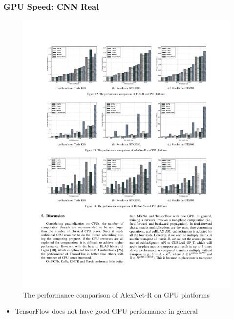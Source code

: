 \begin{frame}
	\MyLogo
	\frametitle{GPU Speed: CNN Real}

	\begin{figure}[htbp] 
		\includegraphics[width=\linewidth]{figures/AlexNet-R2.pdf} 
		\caption{The performance comparison of AlexNet-R on GPU platforms}
	\end{figure}

\vskip -10pt
\begin{mdframed}[style=mystyle1]
\begin{itemize}
\item TensorFlow does not have good GPU performance in general
\end{itemize}
\end{mdframed}

\end{frame}


